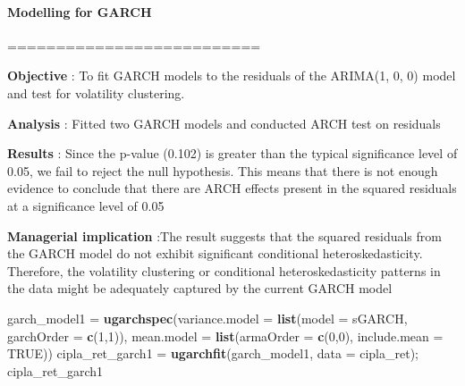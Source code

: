 \documentclass[
]{article}
\newenvironment{Shaded}{\begin{snugshade}}{\end{snugshade}}
\newcommand{\AttributeTok}[1]{\textcolor[rgb]{0.13,0.29,0.53}{#1}}
\newcommand{\ConstantTok}[1]{\textcolor[rgb]{0.56,0.35,0.01}{#1}}
\newcommand{\DecValTok}[1]{\textcolor[rgb]{0.00,0.00,0.81}{#1}}
\newcommand{\FunctionTok}[1]{\textcolor[rgb]{0.13,0.29,0.53}{\textbf{#1}}}
\newcommand{\NormalTok}[1]{#1}
\newcommand{\OtherTok}[1]{\textcolor[rgb]{0.56,0.35,0.01}{#1}}
\newcommand{\StringTok}[1]{\textcolor[rgb]{0.31,0.60,0.02}{#1}}
\begin{document}
\hypertarget{modelling-for-garch}{%
\paragraph{\texorpdfstring{\textbf{Modelling for
GARCH}}{Modelling for GARCH}}\label{modelling-for-garch}}

==========================

\textbf{Objective} : To fit GARCH models to the residuals of the
ARIMA(1, 0, 0) model and test for volatility clustering.

\textbf{Analysis} : Fitted two GARCH models and conducted ARCH test on
residuals

\textbf{Results} : Since the p-value (0.102) is greater than the typical
significance level of 0.05, we fail to reject the null hypothesis. This
means that there is not enough evidence to conclude that there are ARCH
effects present in the squared residuals at a significance level of 0.05

\textbf{Managerial implication} :The result suggests that the squared
residuals from the GARCH model do not exhibit significant conditional
heteroskedasticity. Therefore, the volatility clustering or conditional
heteroskedasticity patterns in the data might be adequately captured by
the current GARCH model

\begin{Shaded}
\begin{Highlighting}[]
\NormalTok{garch\_model1 }\OtherTok{=} \FunctionTok{ugarchspec}\NormalTok{(}\AttributeTok{variance.model =} \FunctionTok{list}\NormalTok{(}\AttributeTok{model =} \StringTok{\textquotesingle{}sGARCH\textquotesingle{}}\NormalTok{, }\AttributeTok{garchOrder =} \FunctionTok{c}\NormalTok{(}\DecValTok{1}\NormalTok{,}\DecValTok{1}\NormalTok{)), }\AttributeTok{mean.model =} \FunctionTok{list}\NormalTok{(}\AttributeTok{armaOrder =} \FunctionTok{c}\NormalTok{(}\DecValTok{0}\NormalTok{,}\DecValTok{0}\NormalTok{), }\AttributeTok{include.mean =} \ConstantTok{TRUE}\NormalTok{))}
\NormalTok{cipla\_ret\_garch1 }\OtherTok{=} \FunctionTok{ugarchfit}\NormalTok{(garch\_model1, }\AttributeTok{data =}\NormalTok{ cipla\_ret); }
\NormalTok{cipla\_ret\_garch1}
\end{Highlighting}
\end{Shaded}
\end{document}
